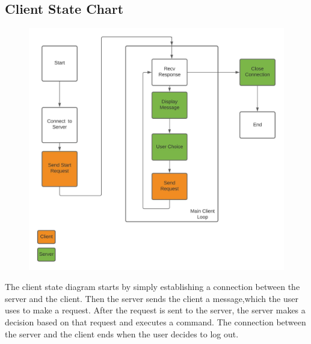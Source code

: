 \documentclass[11pt]{article}
\begin{document}
		\subsection{Client State Chart}
			\begin{figure}[H]
				\centering
				\includegraphics[scale=0.5]{Client_State_Diagram}
				\label{fig:clientstatediagram}
			\end{figure}
		The client state diagram starts by simply establishing a connection between the server and the client. Then the server sends the client a message,which the user uses to make a request. After the request is sent to the server, the server makes a decision based on that request and executes a command. The connection between the server and the client ends when the user decides to log out.
\end{document}
